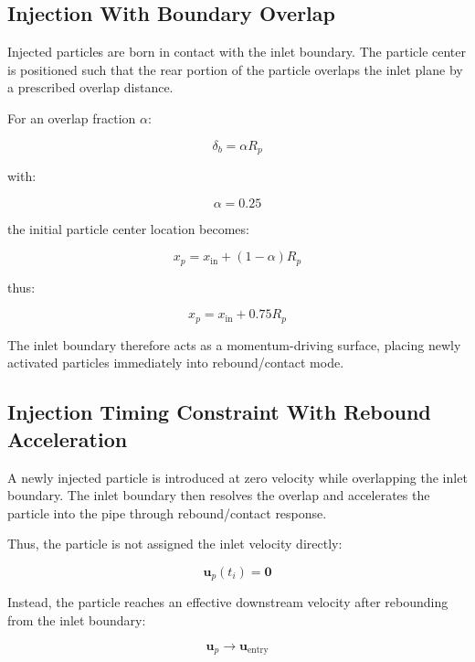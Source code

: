 \documentclass[11pt]{article}
\begin{document}
\subsection{Injection With Boundary Overlap}

Injected particles are born in contact with the inlet boundary. The particle center is positioned such that the rear portion of the particle overlaps the inlet plane by a prescribed overlap distance.

For an overlap fraction $\alpha$:

\begin{equation}
\delta_b
=
\alpha R_p
\end{equation}

with:

\begin{equation}
\alpha = 0.25
\end{equation}

the initial particle center location becomes:

\begin{equation}
x_p
=
x_{\mathrm{in}}
+
(1-\alpha)R_p
\end{equation}

thus:

\begin{equation}
x_p
=
x_{\mathrm{in}}
+
0.75R_p
\end{equation}

The inlet boundary therefore acts as a momentum-driving surface, placing newly activated particles immediately into rebound/contact mode.
\subsection{Injection Timing Constraint With Rebound Acceleration}

A newly injected particle is introduced at zero velocity while overlapping the inlet boundary. The inlet boundary then resolves the overlap and accelerates the particle into the pipe through rebound/contact response.

Thus, the particle is not assigned the inlet velocity directly:

\begin{equation}
\mathbf{u}_p(t_i) = \mathbf{0}
\end{equation}

Instead, the particle reaches an effective downstream velocity after rebounding from the inlet boundary:

\begin{equation}
\mathbf{u}_p \rightarrow \mathbf{u}_{\mathrm{entry}}
\end{equation}
\end{document}

